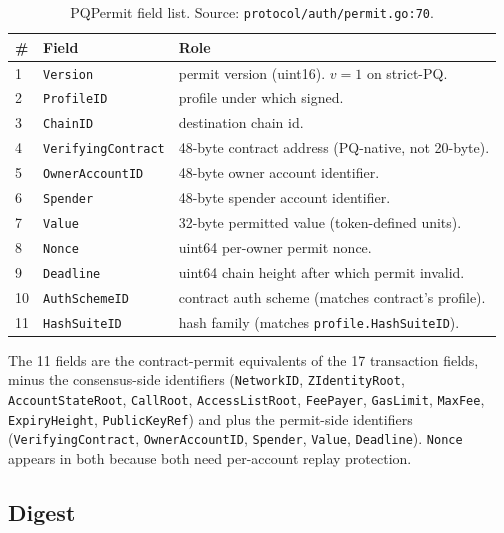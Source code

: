 \begin{table}[H]
\centering
\caption{PQPermit field list. Source: \texttt{protocol/auth/permit.go:70}.}
\label{tab:pq-permit-fields}
\begin{tabular}{llp{6.5cm}}
\toprule
\# & Field & Role \\
\midrule
1  & \texttt{Version}            & permit version (uint16). $v=1$ on strict-PQ. \\
2  & \texttt{ProfileID}          & profile under which signed. \\
3  & \texttt{ChainID}            & destination chain id. \\
4  & \texttt{VerifyingContract}  & 48-byte contract address (PQ-native, not 20-byte). \\
5  & \texttt{OwnerAccountID}     & 48-byte owner account identifier. \\
6  & \texttt{Spender}            & 48-byte spender account identifier. \\
7  & \texttt{Value}              & 32-byte permitted value (token-defined units). \\
8  & \texttt{Nonce}              & uint64 per-owner permit nonce. \\
9  & \texttt{Deadline}           & uint64 chain height after which permit invalid. \\
10 & \texttt{AuthSchemeID}       & contract auth scheme (matches contract's profile). \\
11 & \texttt{HashSuiteID}        & hash family (matches \texttt{profile.HashSuiteID}). \\
\bottomrule
\end{tabular}
\end{table}

The 11 fields are the contract-permit equivalents of the 17 transaction
fields, minus the consensus-side identifiers (\texttt{NetworkID},
\texttt{ZIdentityRoot}, \texttt{AccountStateRoot}, \texttt{CallRoot},
\texttt{AccessListRoot}, \texttt{FeePayer}, \texttt{GasLimit},
\texttt{MaxFee}, \texttt{ExpiryHeight}, \texttt{PublicKeyRef}) and plus the
permit-side identifiers (\texttt{VerifyingContract},
\texttt{OwnerAccountID}, \texttt{Spender}, \texttt{Value},
\texttt{Deadline}). \texttt{Nonce} appears in both because both need
per-account replay protection.

\subsection{Digest}

